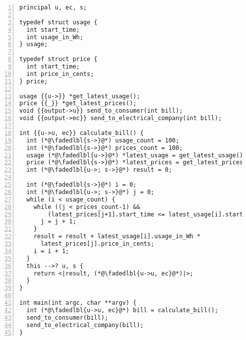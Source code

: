 \begin{lstlisting}[float, style=dlmc, numbers=left, caption={Labelled smart meter bill calculation example}, label=example:code:calculate_bill-explicit]
principal u, ec, s;

typedef struct usage {
  int start_time;
  int usage_in_Wh;
} usage;

typedef struct price {
  int start_time;
  int price_in_cents;
} price;

usage {{u->}} *get_latest_usage();
price {{_}} *get_latest_prices();
void {{output->u}} send_to_consumer(int bill);
void {{output->ec}} send_to_electrical_company(int bill);

int {{u->u, ec}} calculate_bill() {
  int (*@\fadedlbl{s->}@*) usage_count = 100;
  int (*@\fadedlbl{s->}@*) prices_count = 100;
  usage (*@\fadedlbl{u->}@*) *latest_usage = get_latest_usage();
  price (*@\fadedlbl{s->}@*) *latest_prices = get_latest_prices();
  int (*@\fadedlbl{u->; s->}@*) result = 0;

  int (*@\fadedlbl{s->}@*) i = 0;
  int (*@\fadedlbl{u->; s->}@*) j = 0;
  while (i < usage_count) {
    while ((j < prices_count-1) &&
        (latest_prices[j+1].start_time <= latest_usage[i].start_time)) {
      j = j + 1;
    }
    result = result + latest_usage[i].usage_in_Wh *
      latest_prices[j].price_in_cents;
    i = i + 1;
  }
  this -->? u, s {
    return <|result, (*@\fadedlbl{u->u, ec}@*)|>;
  }
}

int main(int argc, char **argv) {
  int (*@\fadedlbl{u->u, ec}@*) bill = calculate_bill();
  send_to_consumer(bill);
  send_to_electrical_company(bill);
}
\end{lstlisting}
